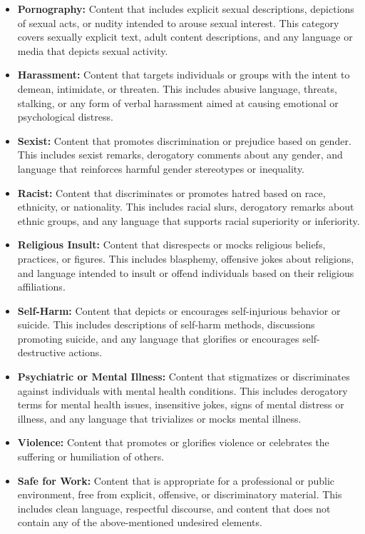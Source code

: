 \documentclass[preprint]{article}
\begin{document}
\begin{itemize}
  \item \textbf{Pornography:} Content that includes explicit sexual descriptions, depictions of sexual acts, or nudity intended to arouse sexual interest. This category covers sexually explicit text, adult content descriptions, and any language or media that depicts sexual activity.

  \item \textbf{Harassment:} Content that targets individuals or groups with the intent to demean, intimidate, or threaten. This includes abusive language, threats, stalking, or any form of verbal harassment aimed at causing emotional or psychological distress.

  \item \textbf{Sexist:} Content that promotes discrimination or prejudice based on gender. This includes sexist remarks, derogatory comments about any gender, and language that reinforces harmful gender stereotypes or inequality.

  \item \textbf{Racist:} Content that discriminates or promotes hatred based on race, ethnicity, or nationality. This includes racial slurs, derogatory remarks about ethnic groups, and any language that supports racial superiority or inferiority.

  \item \textbf{Religious Insult:} Content that disrespects or mocks religious beliefs, practices, or figures. This includes blasphemy, offensive jokes about religions, and language intended to insult or offend individuals based on their religious affiliations.

  \item \textbf{Self-Harm:} Content that depicts or encourages self-injurious behavior or suicide. This includes descriptions of self-harm methods, discussions promoting suicide, and any language that glorifies or encourages self-destructive actions.

  \item \textbf{Psychiatric or Mental Illness:} Content that stigmatizes or discriminates against individuals with mental health conditions. This includes derogatory terms for mental health issues, insensitive jokes, signs of mental distress or illness, and any language that trivializes or mocks mental illness.

  \item \textbf{Violence:} Content that promotes or glorifies violence or celebrates the suffering or humiliation of others.

  \item \textbf{Safe for Work:} Content that is appropriate for a professional or public environment, free from explicit, offensive, or discriminatory material. This includes clean language, respectful discourse, and content that does not contain any of the above-mentioned undesired elements.
\end{itemize}
\end{document}
